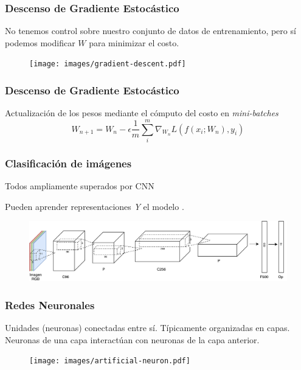 \documentclass{beamer}
\begin{document}
\begin{frame}
\frametitle{Descenso de Gradiente Estocástico}
No tenemos control sobre nuestro conjunto de datos de entrenamiento, pero sí podemos modificar \(W\) para minimizar el costo.
\vfill
\begin{figure}
    \centering
    \texttt{[image: images/gradient-descent.pdf]}
\end{figure}
\vfill
\end{frame}





\begin{frame}
\frametitle{Descenso de Gradiente Estocástico}
Actualización de los pesos mediante el cómputo del costo en \textit{mini-batches}
\vfill
\begin{equation}
    W_{n+1} = W_n - \epsilon \frac{1}{m} \sum^{m}_{i} \nabla_{W_{n}} L(f(x_i; W_n), y_i)
\end{equation}
\vfill

\vfill
\end{frame}





\begin{frame}
\frametitle{Clasificación de imágenes}

Todos ampliamente superados por CNN

Pueden aprender representaciones \emph{Y} el modelo .
\begin{figure}
    \centering
    \includegraphics[width=\textwidth]{images/net_example.pdf}
\end{figure}
\end{frame}





\begin{frame}[plain]
\frametitle{Redes Neuronales}
\vfill
Unidades (neuronas) conectadas entre sí.
\vfill
Típicamente organizadas en capas.
\vfill
Neuronas de una capa interactúan con neuronas de la capa anterior.
\begin{figure}
    \centering
    \texttt{[image: images/artificial-neuron.pdf]}
\end{figure}
\end{frame}
\end{document}
